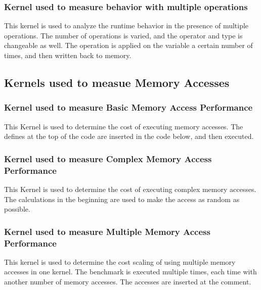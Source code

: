 

\subsubsection{Kernel used to measure behavior with multiple operations}
\label{sect:appendix_opencl_ops_multiple}

This kernel is used to analyze the runtime behavior in the presence of multiple operations. The number of operations is varied, and the operator and type is changeable as well. The operation is applied on the variable a certain number of times, and then written back to memory. \\



\subsection{Kernels used to measue Memory Accesses}
\label{sect:appendix_opencl_access}
\subsubsection{Kernel used to measure Basic Memory Access Performance}
\label{sect:appendix_opencl_access_single}
This Kernel is used to determine the cost of executing memory accesses. The defines at the top of the code are inserted in the code below, and then executed. \\



\subsubsection{Kernel used to measure Complex Memory Access Performance}
\label{sect:appendix_opencl_access_complex}
This Kernel is used to determine the cost of executing complex memory accesses. The calculations in the beginning are used to make the access as random as possible. \\



\subsubsection{Kernel used to measure Multiple Memory Access Performance}
\label{sect:appendix_opencl_access_multiple}
This kernel is used to determine the cost scaling of using multiple memory accesses in one kernel. The benchmark is executed multiple times, each time with another number of memory accesses. The accesses are inserted at the  comment. \\

